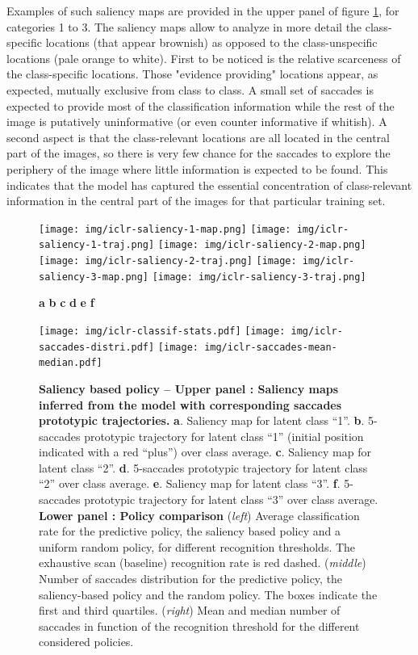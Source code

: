 \documentclass{article} %
\begin{document}
Examples of such saliency maps are provided in the upper panel of figure \ref{fig:saliency-maps}, for categories 1 to 3. The saliency maps allow to analyze in more detail the class-specific locations (that appear brownish) as opposed to the class-unspecific locations (pale orange to white). First to be noticed is the relative scarceness of the class-specific locations. Those "evidence providing" locations appear, as expected, mutually exclusive from class to class. A small set of saccades is expected to provide most of the classification information while the rest of the image is putatively uninformative (or even counter informative if whitish). A second aspect is that the class-relevant locations are all located in the central part of the images, so there is very few chance for the saccades to explore the periphery of the image where little information is expected to be found. This indicates that the model has captured the essential concentration of class-relevant information in the central part of the images for that particular training set.

\begin{figure}[t!]
	\centerline{
		\hfill
		\texttt{[image: img/iclr-saliency-1-map.png]}
		\hfill
		\texttt{[image: img/iclr-saliency-1-traj.png]}
		\hfill
		\texttt{[image: img/iclr-saliency-2-map.png]}
		\hfill	
		\texttt{[image: img/iclr-saliency-2-traj.png]}
		\hfill	
		\texttt{[image: img/iclr-saliency-3-map.png]}
		\hfill 
		\texttt{[image: img/iclr-saliency-3-traj.png]}
		\hfill	
	}
	\centerline{
		\hspace{1cm}
		\textbf{a}
		\hfill
		\textbf{b}
		\hfill
		\textbf{c}
		\hfill
		\textbf{d}
		\hfill
		\textbf{e}
		\hfill
		\textbf{f}
		\hspace{1cm}
	}
	\centerline{
		\hfill
		\texttt{[image: img/iclr-classif-stats.pdf]}
		\hfill
		\texttt{[image: img/iclr-saccades-distri.pdf]}
		\hfill	 
		\texttt{[image: img/iclr-saccades-mean-median.pdf]}
		\hfill
	}
	\caption{\textbf{Saliency based policy -- Upper panel : Saliency maps inferred from the model with corresponding saccades prototypic trajectories.} \textbf{a}. Saliency map for latent class ``1''. \textbf{b}. 5-saccades prototypic trajectory for latent class ``1'' (initial position indicated with a red ``plus'') over class average. \textbf{c}. Saliency map for latent class ``2''. \textbf{d}. 5-saccades prototypic trajectory for latent class ``2'' over class average. \textbf{e}. Saliency map for latent class ``3''. \textbf{f}. 5-saccades prototypic trajectory for latent class ``3'' over class average. \textbf{Lower panel : Policy comparison} (\textit{left}) Average classification rate for the predictive policy, the saliency based policy and a uniform random policy, for different recognition thresholds. The exhaustive scan (baseline) recognition rate is  red dashed. (\textit{middle}) Number of saccades distribution for the predictive policy, the saliency-based policy and the random policy. The boxes indicate the first and third quartiles. (\textit{right}) Mean and median number of saccades in function of the recognition threshold for the different considered policies. }\label{fig:saliency-maps}
\end{figure}
\end{document}
